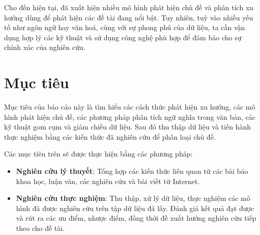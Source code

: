 Cho đến hiện tại, đã xuất hiện nhiều mô hình phát hiện chủ đề và phân tích xu hướng dùng để phát hiện các đề tài đang nổi bật. Tuy nhiên, tuỳ vào nhiều yếu tố như ngôn ngữ hay văn hoá, cùng với sự phong phú của dữ liệu, ta cần vận dụng hợp lý các kỹ thuật và sử dụng công nghệ phù hợp để đảm bảo cho sự chính xác của nghiên cứu.

\section{Mục tiêu}
Mục tiêu của báo cáo này là tìm hiểu các cách thức phát hiện xu hướng, các mô hình phát hiện chủ đề, các phương pháp phân tích ngữ nghĩa trong văn bản, các kỹ thuật gom cụm và giảm chiều dữ liệu. Sau đó thu thập dữ liệu và tiến hành thực nghiệm bằng các kiến thức đã nghiên cứu để phân loại chủ đề.

Các mục tiêu trên sẽ được thực hiện bằng các phương pháp:
\begin{itemize}
	\item \textbf{Nghiên cứu lý thuyết}: Tổng hợp các kiến thức liên quan từ các bài báo khoa học, luận văn, các nghiên cứu và bài viết từ Internet.
	\item \textbf{Nghiên cứu thực nghiệm}: Thu thập, xử lý dữ liệu, thực nghiệm các mô hình đã được nghiên cứu trên tập dữ liệu đã lấy. Đánh giá kết quả đạt được và rút ra các ưu điểm, nhược điểm, đồng thời đề xuất hướng nghiên cứu tiếp theo cho đề tài.
\end{itemize}
